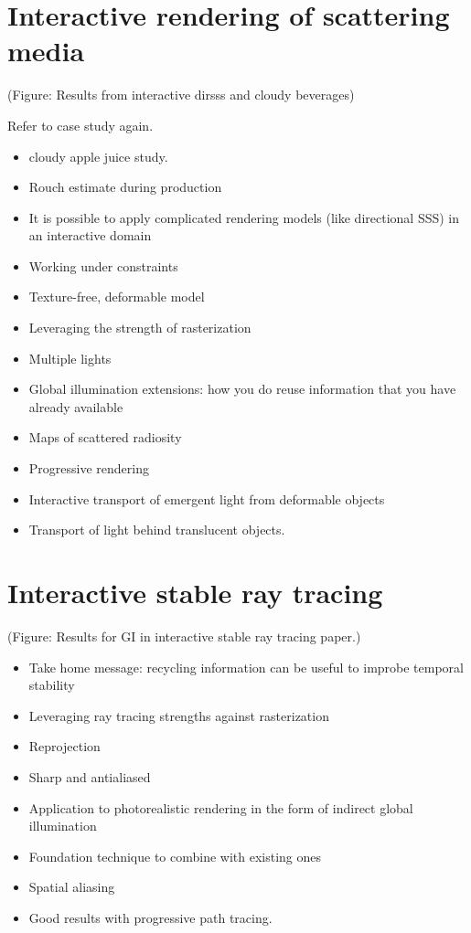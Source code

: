 \section{Interactive rendering of scattering media}
(Figure: Results from interactive dirsss and cloudy beverages)

Refer to case study again.

\begin{itemize}
\item cloudy apple juice study.
\item Rouch estimate during production
\item It is possible to apply complicated rendering models (like directional SSS) in an interactive domain
\item Working under constraints
\item Texture-free, deformable model
\item Leveraging the strength of rasterization
\item Multiple lights
\item Global illumination extensions: how you do reuse information that you have already available
\item Maps of scattered radiosity
\item Progressive rendering
\item Interactive transport of emergent light from deformable objects
\item Transport of light behind translucent objects.
\end{itemize}


\section{Interactive stable ray tracing}
(Figure: Results for GI in interactive stable ray tracing paper.)

\begin{itemize}
\item Take home message: recycling information can be useful to improbe temporal stability 
\item Leveraging ray tracing strengths against rasterization
\item Reprojection 
\item Sharp and antialiased
\item Application to photorealistic rendering in the form of indirect global illumination
\item Foundation technique to combine with existing ones
\item Spatial aliasing
\item Good results with progressive path tracing.
\end{itemize}

